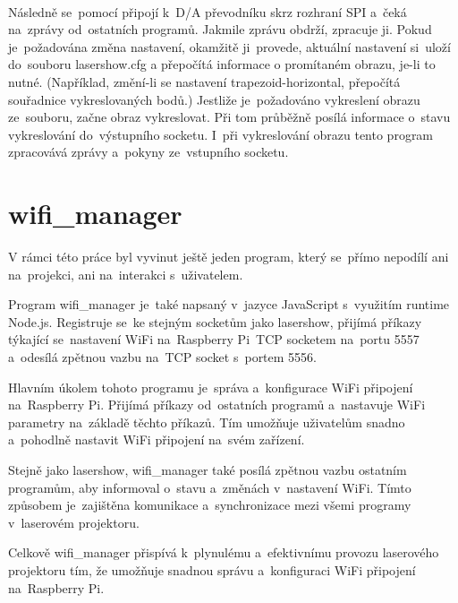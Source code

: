 \





Následně se~pomocí připojí k~D/A převodníku skrz rozhraní SPI\cite{wiki-SPI} a~čeká na~zprávy od~ostatních programů. Jakmile zprávu obdrží, zpracuje ji.
Pokud je~požadována změna nastavení, okamžitě ji~provede, aktuální nastavení si~uloží do~souboru lasershow.cfg a přepočítá informace o promítaném obrazu, je-li to nutné.
(Například, změní-li se nastavení trapezoid-horizontal, přepočítá souřadnice vykreslovaných bodů.) Jestliže je~požadováno vykreslení obrazu ze~souboru, začne obraz vykreslovat.
Při tom průběžně posílá informace o~stavu vykreslování do~výstupního socketu. I~při vykreslování obrazu tento program zpracovává zprávy a~pokyny ze~vstupního socketu.




\section{wifi\_manager}

V rámci této práce byl vyvinut ještě jeden program, který se~přímo nepodílí ani na~projekci, ani na~interakci s~uživatelem.

Program wifi\_manager je~také napsaný v~jazyce JavaScript s~využitím runtime Node.js. Registruje se~ke stejným socketům jako lasershow, přijímá příkazy týkající se~nastavení WiFi na~Raspberry Pi~TCP socketem na~portu 5557 a~odesílá zpětnou vazbu na~TCP socket s~portem 5556.



Hlavním úkolem tohoto programu je~správa a~konfigurace WiFi připojení na~Raspberry Pi. Přijímá příkazy od~ostatních programů a~nastavuje WiFi parametry na~základě těchto příkazů. Tím umožňuje uživatelům snadno a~pohodlně nastavit WiFi připojení na~svém zařízení.

Stejně jako lasershow, wifi\_manager také posílá zpětnou vazbu ostatním programům, aby informoval o~stavu a~změnách v~nastavení WiFi. Tímto způsobem je~zajištěna komunikace a~synchronizace mezi všemi programy v~laserovém projektoru.

Celkově wifi\_manager přispívá k~plynulému a~efektivnímu provozu laserového projektoru tím, že umožňuje snadnou správu a~konfiguraci WiFi připojení na~Raspberry Pi.
